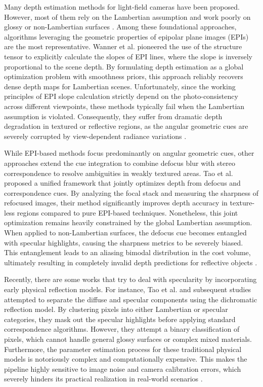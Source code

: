 \documentclass[journal]{IEEEtran}
\begin{document}
Many depth estimation methods for light-field cameras have been proposed. However, most of them rely on the Lambertian assumption and work poorly on glossy or non-Lambertian surfaces . Among these foundational approaches, algorithms leveraging the geometric properties of epipolar plane images (EPIs) are the most representative. Wanner et al.  pioneered the use of the structure tensor to explicitly calculate the slopes of EPI lines, where the slope is inversely proportional to the scene depth. By formulating depth estimation as a global optimization problem with smoothness priors, this approach reliably recovers dense depth maps for Lambertian scenes. Unfortunately, since the working principles of EPI slope calculation strictly depend on the photo-consistency across different viewpoints, these methods typically fail when the Lambertian assumption is violated. Consequently, they suffer from dramatic depth degradation in textured or reflective regions, as the angular geometric cues are severely corrupted by view-dependent radiance variations .

While EPI-based methods focus predominantly on angular geometric cues, other approaches extend the cue integration to combine defocus blur with stereo correspondence to resolve ambiguities in weakly textured areas. Tao et al.  proposed a unified framework that jointly optimizes depth from defocus and correspondence cues. By analyzing the focal stack and measuring the sharpness of refocused images, their method significantly improves depth accuracy in texture-less regions compared to pure EPI-based techniques. Nonetheless, this joint optimization remains heavily constrained by the global Lambertian assumption. When applied to non-Lambertian surfaces, the defocus cue becomes entangled with specular highlights, causing the sharpness metrics to be severely biased. This entanglement leads to an aliasing bimodal distribution in the cost volume, ultimately resulting in completely invalid depth predictions for reflective objects .

Recently, there are some works that try to deal with specularity by incorporating early physical reflection models. For instance, Tao et al.  and subsequent studies  attempted to separate the diffuse and specular components using the dichromatic reflection model. By clustering pixels into either Lambertian or specular categories, they mask out the specular highlights before applying standard correspondence algorithms. However, they attempt a binary classification of pixels, which cannot handle general glossy surfaces or complex mixed materials. Furthermore, the parameter estimation process for these traditional physical models is notoriously complex and computationally expensive. This makes the pipeline highly sensitive to image noise and camera calibration errors, which severely hinders its practical realization in real-world scenarios .
\end{document}
